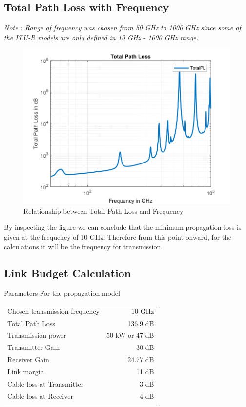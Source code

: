 \documentclass[a4paper,11pt]{article}%
\begin{document}
\subsection{Total Path Loss with Frequency}
\textit{Note : Range of frequency was chosen from 50 GHz to 1000 GHz since some of the ITU-R models are only defined in 10 GHz - 1000 GHz range.}
\begin{figure}[!h]
	\centering
	\includegraphics[scale=0.75]{code/TotalPL.png}
	\caption{Relationship between Total Path Loss and Frequency}
\end{figure}

By inspecting the figure we can conclude that the minimum propagation loss is given at the frequency of 10 GHz. Therefore from this point onward, for the calculations it will be the frequency for transmission.

\subsection{Link Budget Calculation}

Parameters For the propagation model
\begin{tabular}{l r}
Chosen transmission frequency & 10 GHz\\
Total Path Loss & 136.9 dB\\
Transmission power & 50 kW or 47 dB\\
Transmitter Gain & 30 dB\\
Receiver Gain &24.77 dB\\
Link margin  &11 dB\\
Cable loss at Transmitter & 3 dB\\
Cable loss at Receiver &4 dB\\
\end{tabular}\\[1cm]
\end{document}
